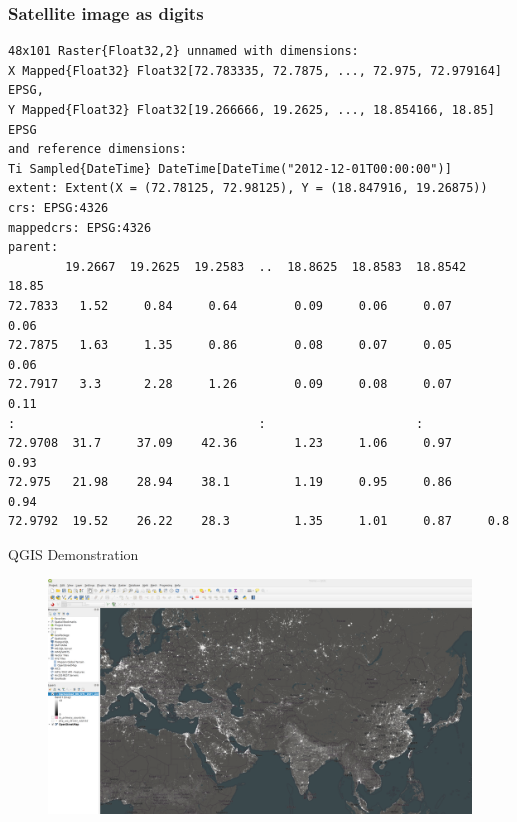 \documentclass[aspectratio=169]{beamer} %
\begin{document}
        
        \begin{frame}[fragile]
        \frametitle{Satellite image as digits}
        \small
        \begin{verbatim}
48x101 Raster{Float32,2} unnamed with dimensions:
X Mapped{Float32} Float32[72.783335, 72.7875, ..., 72.975, 72.979164] EPSG,
Y Mapped{Float32} Float32[19.266666, 19.2625, ..., 18.854166, 18.85] EPSG
and reference dimensions:
Ti Sampled{DateTime} DateTime[DateTime("2012-12-01T00:00:00")]
extent: Extent(X = (72.78125, 72.98125), Y = (18.847916, 19.26875))
crs: EPSG:4326
mappedcrs: EPSG:4326
parent:
        19.2667  19.2625  19.2583  ..  18.8625  18.8583  18.8542  18.85
72.7833   1.52     0.84     0.64        0.09     0.06     0.07     0.06
72.7875   1.63     1.35     0.86        0.08     0.07     0.05     0.06
72.7917   3.3      2.28     1.26        0.09     0.08     0.07     0.11
:                                  :                     :       
72.9708  31.7     37.09    42.36        1.23     1.06     0.97     0.93
72.975   21.98    28.94    38.1         1.19     0.95     0.86     0.94
72.9792  19.52    26.22    28.3         1.35     1.01     0.87     0.8
        \end{verbatim}
        \end{frame}

        \begin{frame}{QGIS Demonstration}
          \begin{figure}
            \includegraphics[width=1\linewidth]{qgis.png}
          \end{figure}
        \end{frame}
\end{document}
